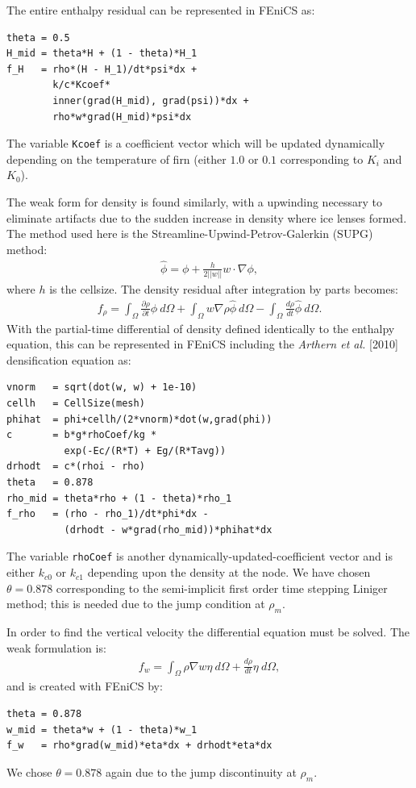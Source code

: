\documentclass{article}%
\begin{document}
The entire enthalpy residual can be represented in FEniCS as:\par
\footnotesize
\begin{verbatim}
theta = 0.5
H_mid = theta*H + (1 - theta)*H_1
f_H   = rho*(H - H_1)/dt*psi*dx + 
        k/c*Kcoef*
        inner(grad(H_mid), grad(psi))*dx + 
        rho*w*grad(H_mid)*psi*dx
\end{verbatim}
\normalsize
The variable \texttt{Kcoef} is a coefficient vector which will be updated dynamically depending on the temperature of firn (either $1.0$ or $0.1$ corresponding to $K_i$ and $K_0$).

The weak form for density is found similarly, with a upwinding necessary to eliminate artifacts due to the sudden increase in density where ice lenses formed.  The method used here is the Streamline-Upwind-Petrov-Galerkin (SUPG) method:
\begin{align*}
    \hat{\phi} = \phi + \frac{h}{2||w||} w \cdot \nabla{\phi},
\end{align*}
where $h$ is the cellsize.  The density residual after integration by parts becomes:
\begin{align*}
  f_{\rho} = 
    \int_{\Omega} \frac{\partial \rho}{\partial t}\phi\ d \Omega + 
    \int_{\Omega} w\nabla \rho \hat{\phi}\ d \Omega -
    \int_{\Omega}\frac{d \rho}{dt}\hat{\phi}\ d \Omega.
\end{align*}
With the partial-time differential of density defined identically to the enthalpy equation, this can be represented in FEniCS including the \emph{Arthern et al.} [2010] densification equation as:\par
\footnotesize
\begin{verbatim}
vnorm   = sqrt(dot(w, w) + 1e-10)
cellh   = CellSize(mesh)
phihat  = phi+cellh/(2*vnorm)*dot(w,grad(phi))
c       = b*g*rhoCoef/kg * 
          exp(-Ec/(R*T) + Eg/(R*Tavg))
drhodt  = c*(rhoi - rho)
theta   = 0.878
rho_mid = theta*rho + (1 - theta)*rho_1
f_rho   = (rho - rho_1)/dt*phi*dx - 
          (drhodt - w*grad(rho_mid))*phihat*dx
\end{verbatim}
\normalsize
The variable \texttt{rhoCoef} is another dynamically-updated-coefficient vector and is either $k_{c0}$ or $k_{c1}$ depending upon the density at the node.  We have chosen $\theta = 0.878$ corresponding to the semi-implicit first order time stepping Liniger method; this is needed due to the jump condition at $\rho_m$.

In order to find the vertical velocity the differential equation must be solved.  The weak formulation is:
\begin{align*}
  f_{w} = 
    \int_{\Omega} \rho \nabla{w} \eta\ d\Omega + \frac{d\rho}{dt} \eta\ d\Omega,
\end{align*}
and is created with FEniCS by:
\footnotesize
\begin{verbatim}
theta = 0.878
w_mid = theta*w + (1 - theta)*w_1
f_w   = rho*grad(w_mid)*eta*dx + drhodt*eta*dx
\end{verbatim}
\normalsize
We chose $\theta=0.878$ again due to the jump discontinuity at $\rho_m$.
\end{document}
